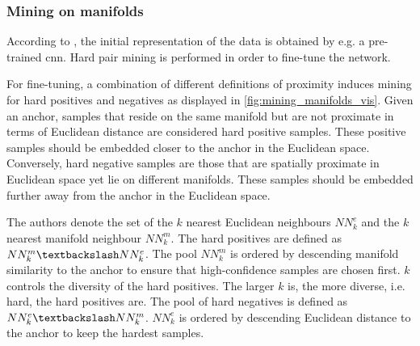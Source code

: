 \subsubsection{Mining on manifolds}\label{subsec:mining_manifolds}



According to \citet{mining_manifolds_2018}, the initial representation of the data is obtained by e.g. a pre-trained \ac{cnn}.
Hard pair mining is performed in order to fine-tune the network.

For fine-tuning, a combination of different definitions of proximity induces mining 
for hard positives and negatives as displayed in \autoref{fig:mining_manifolds_vis}.
Given an anchor, samples that reside on the same manifold but 
are not proximate in terms of Euclidean distance are considered hard positive samples.
These positive samples should be embedded closer to the anchor in the Euclidean space.
Conversely, hard negative samples are those that are spatially proximate in Euclidean space 
yet lie on different manifolds.
These samples should be embedded further away from the anchor in the Euclidean space.

The authors denote the set of the $k$ nearest Euclidean neighbours $NN^e_k$ and 
the $k$ nearest manifold neighbour $NN^m_k$.
The hard positives are defined as $NN^m_k \textbackslash NN^e_k$. 
The pool $NN^m_k$ is ordered by descending manifold similarity to the anchor
to ensure that high-confidence samples are chosen first.
$k$ controls the diversity of the hard positives.
The larger $k$ is, the more diverse, i.e. hard, the hard positives are. 
The pool of hard negatives is defined as $NN^e_k \textbackslash NN^m_k$.
$NN^e_k$ is ordered by descending Euclidean distance to the anchor to keep the hardest samples.


